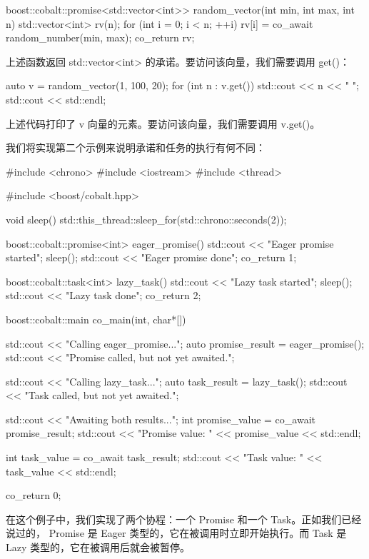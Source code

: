 \begin{cpp}
boost::cobalt::promise<std::vector<int>> random_vector(int min, int
max, int n) {
    std::vector<int> rv(n);
    for (int i = 0; i < n; ++i) {
        rv[i] = co_await random_number(min, max);
    }
    co_return rv;
}
\end{cpp}

上述函数返回 std::vector<int> 的承诺。要访问该向量，我们需要调用 get()：

\begin{cpp}
auto v = random_vector(1, 100, 20);
for (int n : v.get()) {
    std::cout << n << " ";
}
std::cout << std::endl;
\end{cpp}

上述代码打印了 v 向量的元素。要访问该向量，我们需要调用 v.get()。

我们将实现第二个示例来说明承诺和任务的执行有何不同：

\begin{cpp}
#include <chrono>
#include <iostream>
#include <thread>

#include <boost/cobalt.hpp>

void sleep(){
    std::this_thread::sleep_for(std::chrono::seconds(2));
}

boost::cobalt::promise<int> eager_promise(){
    std::cout << "Eager promise started\n";
    sleep();
    std::cout << "Eager promise done\n";
    co_return 1;
}

boost::cobalt::task<int> lazy_task(){
    std::cout << "Lazy task started\n";
    sleep();
    std::cout << "Lazy task done\n";
    co_return 2;
}

boost::cobalt::main co_main(int, char*[]){
    std::cout << "Calling eager_promise...\n";
    auto promise_result = eager_promise();
    std::cout << "Promise called, but not yet awaited.\n";

    std::cout << "Calling lazy_task...\n";
    auto task_result = lazy_task();
    std::cout << "Task called, but not yet awaited.\n";

    std::cout << "Awaiting both results...\n";
    int promise_value = co_await promise_result;
    std::cout << "Promise value: " << promise_value
              << std::endl;

    int task_value = co_await task_result;
    std::cout << "Task value: " << task_value
              << std::endl;

    co_return 0;
}
\end{cpp}

在这个例子中，我们实现了两个协程：一个 Promise 和一个 Task。正如我们已经说过的， Promise 是 Eager 类型的，它在被调用时立即开始执行。而 Task 是 Lazy 类型的，它在被调用后就会被暂停。

